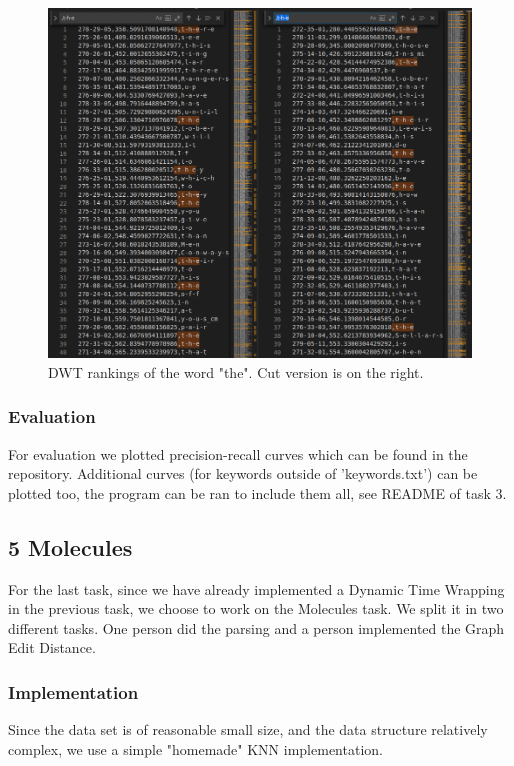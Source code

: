 \documentclass[12pt]{article}
\begin{document}
\begin{figure}
    \centering
    \includegraphics[scale=0.45]{figs/cutoff-ex.png}
    \caption{DWT rankings of the word "the". Cut version is on the right.}
    \label{fig:cutoff_ex}
\end{figure}

\subsubsection*{Evaluation}

For evaluation we plotted precision-recall curves which can be found in the repository. Additional curves (for keywords outside of 'keywords.txt') can be plotted too, the program can be ran to include them all, see README of task 3.

\subsection*{5 Molecules}
For the last task, since we have already implemented a Dynamic Time Wrapping in the previous task, we choose to work on the Molecules task. We split it in two different tasks. One person did the parsing and a person implemented the Graph Edit Distance.

\subsubsection*{Implementation}

Since the data set is of reasonable small size, and the data structure relatively complex,
we use a simple "homemade" KNN implementation.
\end{document}
